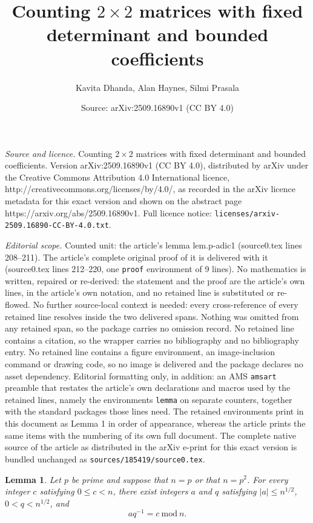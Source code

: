 \documentclass[10pt,a4paper]{amsart}
\title{Counting $2\times 2$ matrices with fixed determinant and bounded coefficients}
\author{Kavita Dhanda, Alan Haynes, Silmi Prasala}
\date{Source: arXiv:2509.16890v1 (CC BY 4.0)}
\newtheorem{lemma}{Lemma}
\begin{document}
\maketitle

\noindent\emph{Source and licence.} Counting $2\times 2$ matrices with fixed determinant and bounded coefficients. Version arXiv:2509.16890v1 (CC BY 4.0), distributed by arXiv under the Creative Commons Attribution 4.0 International licence, http://creativecommons.org/licenses/by/4.0/, as recorded in the arXiv licence metadata for this exact version and shown on the abstract page https://arxiv.org/abs/2509.16890v1. Full licence notice: \texttt{licenses/arxiv-2509.16890-CC-BY-4.0.txt}.\par\smallskip

\noindent\textit{Editorial scope.} Counted unit: the article's lemma lem.p-adic1 (source0.tex lines 208--211). The article's complete original proof of it is delivered with it (source0.tex lines 212--220, one \texttt{proof} environment of 9 lines). No mathematics is written, repaired or re-derived: the statement and the proof are the article's own lines, in the article's own notation, and no retained line is substituted or re-flowed.  No further source-local context is needed: every cross-reference of every retained line resolves inside the two delivered spans.  Nothing was omitted from any retained span, so the package carries no omission record.  No retained line contains a citation, so the wrapper carries no bibliography and no bibliography entry.  No retained line contains a figure environment, an image-inclusion command or drawing code, so no image is delivered and the package declares no asset dependency.  Editorial formatting only, in addition: an AMS \texttt{amsart} preamble that restates the article's own declarations and macros used by the retained lines, namely the environments \texttt{lemma} on separate counters, together with the standard packages those lines need.  The retained environments print in this document as Lemma 1 in order of appearance, whereas the article prints the same items with the numbering of its own full document.  The complete native source of the article as distributed in the arXiv e-print for this exact version is bundled unchanged as \texttt{sources/185419/source0.tex}.
\begin{lemma}\label{lem.p-adic1}
Let $p$ be prime and suppose that $n=p$ or that $n=p^2$. For every integer $c$ satisfying $0\le c< n$, there exist integers $a$ and $q$ satisfying $|a|\le n^{1/2}$, $0<q< n^{1/2}$, and
\[aq^{-1}=c ~\mathrm{mod}~ n.\]
\end{lemma}
\end{document}
